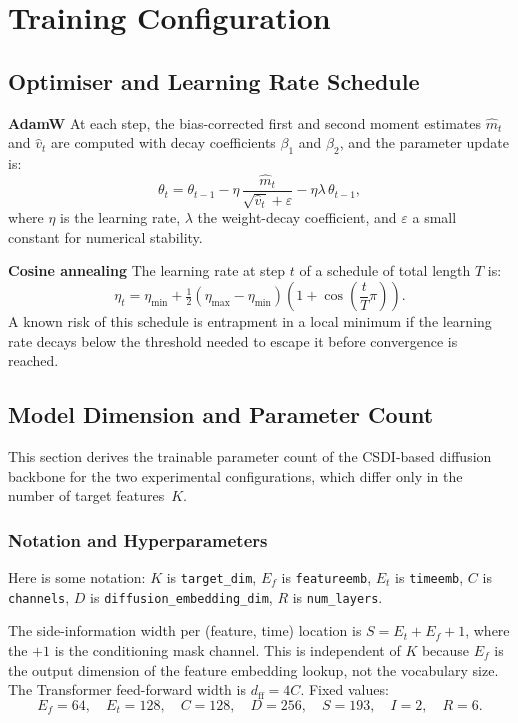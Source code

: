 \chapter{Training Configuration}
\label{app:training_config}

\section{Optimiser and Learning Rate Schedule}
\label{app:sec:optim}

\textbf{AdamW} \quad At each step, the bias-corrected first and second moment
estimates $\hat{m}_t$ and $\hat{v}_t$ are computed with decay coefficients
$\beta_1$ and $\beta_2$, and the parameter update is:
\[
    \theta_t = \theta_{t-1}
        - \eta\,\frac{\hat{m}_t}{\sqrt{\hat{v}_t} + \varepsilon}
        - \eta\lambda\,\theta_{t-1},
\]
where $\eta$ is the learning rate, $\lambda$ the weight-decay coefficient, and
$\varepsilon$ a small constant for numerical stability.

\textbf{Cosine annealing} \quad The learning rate at step $t$ of a schedule of
total length $T$ is:
\[
    \eta_t = \eta_{\min}
    + \tfrac{1}{2}(\eta_{\max} - \eta_{\min})
    \!\left(1 + \cos\!\left(\frac{t}{T}\pi\right)\right).
\]
A known risk of this schedule is entrapment in a local minimum if the learning
rate decays below the threshold needed to escape it before convergence is
reached.

\section{Model Dimension and Parameter Count}
\label{app:model-parameter-count}

This section derives the trainable parameter count of the CSDI-based diffusion
backbone for the two experimental configurations, which differ only in the
number of target features~$K$.

\subsection{Notation and Hyperparameters}
Here is some notation: \(K\) is \texttt{target\_dim}, 
\(E_f\) is \texttt{featureemb},
\(E_t\) is \texttt{timeemb}, \(C\) is \texttt{channels}, \(D\) is \texttt{diffusion\_embedding\_dim}, \(R\) is \texttt{num\_layers}.

The side-information width per (feature, time) location is
$S = E_t + E_f + 1$,
where the $+1$ is the conditioning mask channel.
This is independent of $K$ because $E_f$ is the output dimension of the
feature embedding lookup, not the vocabulary size.
The Transformer feed-forward width is $d_{\mathrm{ff}} = 4C$.
Fixed values:
\[
E_f = 64,\quad
E_t = 128,\quad
C = 128,\quad
D = 256,\quad
S = 193,\quad
I = 2,\quad
R = 6.
\]

